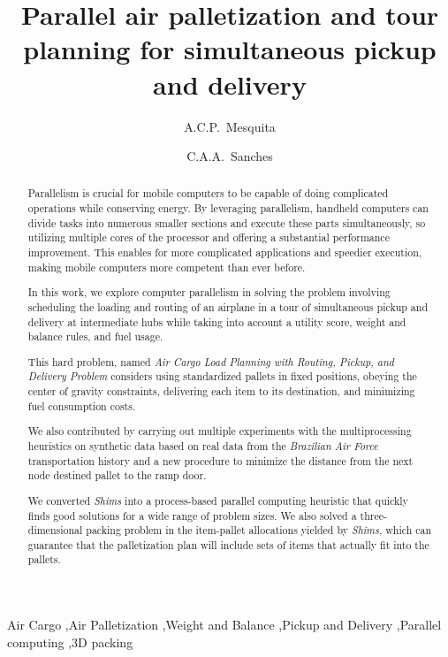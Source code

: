 \documentclass[preprint,authoryear]{elsarticle}
\begin{document}
\begin{frontmatter}

\title{Parallel air palletization and tour planning for simultaneous pickup and delivery}

\author{A.C.P.~Mesquita}

\author{C.A.A.~Sanches}

\address {Instituto Tecnol\'{o}gico de Aeron\'{a}utica - DCTA/ITA/IEC\\
Pra\c{c}a Mal. Eduardo Gomes, 50\\
S\~{a}o Jos\'{e} dos Campos - SP - 12.228-900 - Brazil}


\begin{abstract}

Parallelism is crucial for mobile computers to be capable of doing complicated operations while conserving energy. By leveraging parallelism, handheld computers can divide tasks into numerous smaller sections and execute these parts simultaneously, so utilizing multiple cores of the processor and offering a substantial performance improvement. This enables for more complicated applications and speedier execution, making mobile computers more competent than ever before.

In this work, we explore computer parallelism in solving the problem involving scheduling the loading and routing of an airplane in a tour of simultaneous pickup and delivery at intermediate hubs while taking into account a utility score, weight and balance rules, and fuel usage.

This hard problem, named {\it Air Cargo Load Planning with Routing, Pickup, and Delivery Problem} considers using standardized pallets in fixed positions, obeying the center of gravity constraints, delivering each item to its destination, and minimizing fuel consumption costs.

We also contributed by carrying out multiple experiments with the multiprocessing heuristics on synthetic data based on real data from the {\it Brazilian Air Force} transportation history and a new procedure to minimize the distance from the next node destined pallet to the ramp door.

We converted {\it Shims} into a process-based parallel computing heuristic that quickly finds good solutions for a wide range of problem sizes. We also solved a three-dimensional packing problem in the item-pallet allocations yielded by {\it Shims}, which can guarantee that the palletization plan will include sets of items that actually fit into the pallets.

\end{abstract}

\begin{keyword}
Air Cargo \sep Air Palletization \sep Weight and Balance \sep Pickup and Delivery \sep Parallel computing \sep 3D packing
\end{keyword}

\end{frontmatter}
\end{document}
